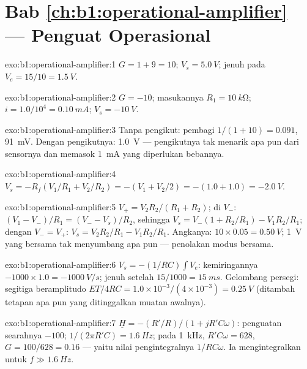 \section*{Bab \ref{ch:b1:operational-amplifier} --- Penguat Operasional}

\begin{solution}{exo:b1:operational-amplifier:1}
$G = 1 + 9 = 10$; $V_s = \qty{5.0}{V}$; jenuh pada $V_e = 15/10 =
\qty{1.5}{V}$.
\end{solution}

\begin{solution}{exo:b1:operational-amplifier:2}
$G = -10$;  masukannya $R_1 = \qty{10}{k\ohm}$; $i = 1.0/10^4 =
\qty{0.10}{mA}$; $V_s = \qty{-10}{V}$.
\end{solution}

\begin{solution}{exo:b1:operational-amplifier:3}
Tanpa pengikut: pembagi $1/(1 + 10) = 0.091$, \qty{91}{mV}. Dengan
pengikutnya: \qty{1.0}{V} --- pengikutnya tak menarik apa pun dari
sensornya dan memasok \qty{1}{mA} yang diperlukan bebannya.
\end{solution}

\begin{solution}{exo:b1:operational-amplifier:4}
$V_s = -R_f(V_1/R_1 + V_2/R_2) = -(V_1 + V_2/2) = -(1.0 + 1.0) = \qty{-2.0}{V}$.
\end{solution}

\begin{solution}{exo:b1:operational-amplifier:5}
$V_+ = V_2R_2/(R_1 + R_2)$; di $V_-$: $(V_1 - V_-)/R_1 = (V_- - V_s)/R_2$,
sehingga $V_s = V_-(1 + R_2/R_1) - V_1R_2/R_1$; dengan $V_- = V_+$:
$V_s = V_2R_2/R_1 - V_1R_2/R_1$. Angkanya: $10 \times 0.05 = \qty{0.50}{V}$;
\qty{1}{V} yang bersama tak menyumbang apa pun --- penolakan modus bersama.
\end{solution}

\begin{solution}{exo:b1:operational-amplifier:6}
$V_s = -(1/RC)\int V_e$: kemiringannya $-1000 \times 1.0 = \qty{-1000}{V/s}$;
jenuh setelah $15/1000 = \qty{15}{ms}$. Gelombang persegi: segitiga
beramplitudo $ET/4RC = 1.0 \times 10^{-3}/(4 \times 10^{-3}) = \qty{0.25}{V}$
(ditambah tetapan apa pun yang ditinggalkan muatan awalnya).
\end{solution}

\begin{solution}{exo:b1:operational-amplifier:7}
$\underline H = -(R'/R)/(1 + jR'C\omega)$: penguatan searahnya $-100$;
 $1/(2\pi R'C) = \qty{1.6}{Hz}$; pada \qty{1}{kHz},
$R'C\omega = 628$, $G =
100/628 = 0.16$ --- yaitu nilai pengintegralnya $1/RC\omega$. Ia
mengintegralkan untuk $f \gg \qty{1.6}{Hz}$.
\end{solution}

